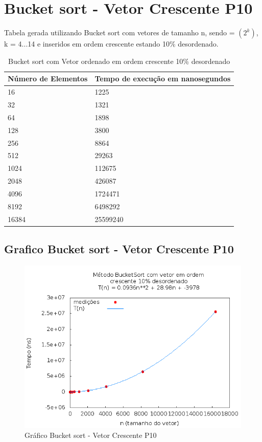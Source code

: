 \documentclass[12pt,a4paper,twoside]{report}
\begin{document}
\section{Bucket sort - Vetor Crescente P10}
Tabela gerada utilizando Bucket sort com vetores de tamanho n, sendo = $(2^k)$, k = 4...14 e inseridos em ordem crescente estando 10\% desordenado.

\begin{table}[H]
\centering
\caption{Bucket sort com Vetor ordenado em ordem crescente 10\% desordenado}
\label{my-label}
\begin{tabular}{|l|l|}
\hline
\multicolumn{1}{|c|}{\textbf{Número de Elementos}} & \multicolumn{1}{c|}{\textbf{Tempo de execução em nanosegundos}} \\ \hline
16 & 1225 \\ \hline
32 & 1321 \\ \hline
64 & 1898 \\ \hline
128 & 3800 \\ \hline
256 & 8864 \\ \hline
512 & 29263 \\ \hline
1024 & 112675 \\ \hline
2048 & 426087 \\ \hline
4096 & 1724471 \\ \hline
8192 & 6498292 \\ \hline
16384 & 25599240 \\ \hline
\end{tabular}
\end{table}

\subsection{Grafico Bucket sort - Vetor Crescente P10}
\begin{figure}[H]
    \centering
    \includegraphics[width=0.7\linewidth]{graficos/Bucket/vIntCrescenteP10/vIntCrescenteP10.png}
  \caption{Gráfico Bucket sort - Vetor Crescente P10}
\end{figure}
\end{document}
